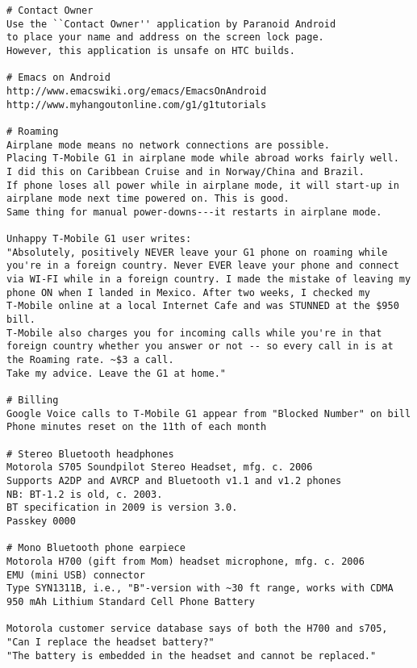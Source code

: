 \documentclass[12pt,twoside]{article}
\begin{document}
\begin{verbatim}
# Contact Owner
Use the ``Contact Owner'' application by Paranoid Android
to place your name and address on the screen lock page.
However, this application is unsafe on HTC builds.

# Emacs on Android
http://www.emacswiki.org/emacs/EmacsOnAndroid
http://www.myhangoutonline.com/g1/g1tutorials

# Roaming
Airplane mode means no network connections are possible.
Placing T-Mobile G1 in airplane mode while abroad works fairly well.
I did this on Caribbean Cruise and in Norway/China and Brazil.
If phone loses all power while in airplane mode, it will start-up in
airplane mode next time powered on. This is good. 
Same thing for manual power-downs---it restarts in airplane mode.

Unhappy T-Mobile G1 user writes:
"Absolutely, positively NEVER leave your G1 phone on roaming while
you're in a foreign country. Never EVER leave your phone and connect
via WI-FI while in a foreign country. I made the mistake of leaving my
phone ON when I landed in Mexico. After two weeks, I checked my
T-Mobile online at a local Internet Cafe and was STUNNED at the $950 bill.
T-Mobile also charges you for incoming calls while you're in that
foreign country whether you answer or not -- so every call in is at
the Roaming rate. ~$3 a call.
Take my advice. Leave the G1 at home."

# Billing
Google Voice calls to T-Mobile G1 appear from "Blocked Number" on bill
Phone minutes reset on the 11th of each month

# Stereo Bluetooth headphones
Motorola S705 Soundpilot Stereo Headset, mfg. c. 2006
Supports A2DP and AVRCP and Bluetooth v1.1 and v1.2 phones
NB: BT-1.2 is old, c. 2003.
BT specification in 2009 is version 3.0.
Passkey 0000

# Mono Bluetooth phone earpiece
Motorola H700 (gift from Mom) headset microphone, mfg. c. 2006
EMU (mini USB) connector
Type SYN1311B, i.e., "B"-version with ~30 ft range, works with CDMA 
950 mAh Lithium Standard Cell Phone Battery

Motorola customer service database says of both the H700 and s705,
"Can I replace the headset battery?"
"The battery is embedded in the headset and cannot be replaced."


\end{verbatim}
\end{document}
